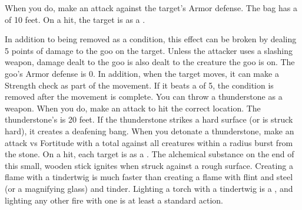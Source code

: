         When you do, make an attack against the target's Armor defense.
        The bag has a  of 10 feet.
        On a hit, the target is \slowed as a .
        \par In addition to being removed as a condition, this effect can be broken by dealing 5 points of damage to the goo on the target.
        Unless the attacker uses a slashing weapon, damage dealt to the goo is also dealt to the creature the goo is on.
        The goo's Armor defense is 0. %
        In addition, when the target moves, it can make a Strength check as part of the movement.
        If it beats a  of 5, the condition is removed after the movement is complete.
         You can throw a thunderstone as a weapon.
        When you do, make an attack to hit the correct location.
        The thunderstone's  is 20 feet.
        If the thunderstone strikes a hard surface (or is struck hard), it creates a deafening bang.
        When you detonate a thunderstone, make an attack vs Fortitude with a  total  against all creatures within a \areasmall radius burst from the stone.
        On a hit, each target is  as a .
         The alchemical substance on the end of this small, wooden stick ignites when struck against a rough surface. Creating a flame with a tindertwig is much faster than creating a flame with flint and steel (or a magnifying glass) and tinder. Lighting a torch with a tindertwig is a , and lighting any other fire with one is at least a standard action.

